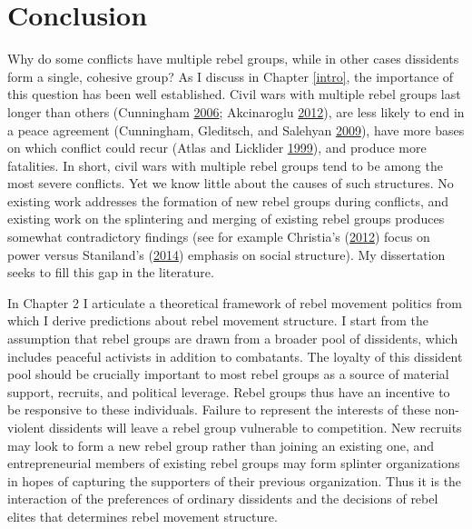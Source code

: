 \documentclass[12pt,]{book}
\theoremstyle{definition}
\theoremstyle{definition}
\theoremstyle{definition}
\theoremstyle{remark}
\begin{document}
\hypertarget{conclusion}{%
\chapter{Conclusion}\label{conclusion}}

Why do some conflicts have multiple rebel groups, while in other cases
dissidents form a single, cohesive group? As I discuss in Chapter
\ref{intro}, the importance of this question has been well established.
Civil wars with multiple rebel groups last longer than others
(Cunningham \protect\hyperlink{ref-Cunningham2006}{2006}; Akcinaroglu
\protect\hyperlink{ref-Akcinaroglu2012}{2012}), are less likely to end
in a peace agreement (Cunningham, Gleditsch, and Salehyan
\protect\hyperlink{ref-Cunningham2009}{2009}), have more bases on which
conflict could recur (Atlas and Licklider
\protect\hyperlink{ref-Atlas1999}{1999}), and produce more fatalities.
In short, civil wars with multiple rebel groups tend to be among the
most severe conflicts. Yet we know little about the causes of such
structures. No existing work addresses the formation of new rebel groups
during conflicts, and existing work on the splintering and merging of
existing rebel groups produces somewhat contradictory findings (see for
example Christia's (\protect\hyperlink{ref-Christia2012}{2012}) focus on
power versus Staniland's (\protect\hyperlink{ref-Staniland2014}{2014})
emphasis on social structure). My dissertation seeks to fill this gap in
the literature.

In Chapter 2 I articulate a theoretical framework of rebel movement
politics from which I derive predictions about rebel movement structure.
I start from the assumption that rebel groups are drawn from a broader
pool of dissidents, which includes peaceful activists in addition to
combatants. The loyalty of this dissident pool should be crucially
important to most rebel groups as a source of material support,
recruits, and political leverage. Rebel groups thus have an incentive to
be responsive to these individuals. Failure to represent the interests
of these non-violent dissidents will leave a rebel group vulnerable to
competition. New recruits may look to form a new rebel group rather than
joining an existing one, and entrepreneurial members of existing rebel
groups may form splinter organizations in hopes of capturing the
supporters of their previous organization. Thus it is the interaction of
the preferences of ordinary dissidents and the decisions of rebel elites
that determines rebel movement structure.
\end{document}

